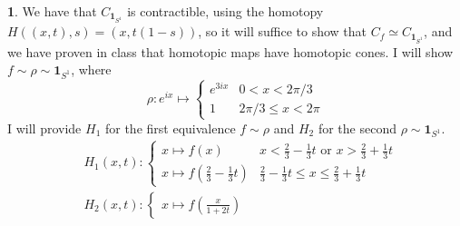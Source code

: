 \documentclass[10.5pt]{article}
\theoremstyle{definition}
\newtheorem{pb}{}
\newcommand{\tor}{\text{ or }}
\newcommand{\ism}{\simeq}
\begin{document}
\begin{pb}
        We have that \(C_{\mathbf{1}_{S^1}}\) is contractible, using the homotopy \(H((x,t),s) = (x,t(1-s))\), so it will suffice to show that \(C_{f} \ism C_{\mathbf{1}_{S^1}}\), and we 
        have proven in class that homotopic maps have homotopic cones. I will show \(f \sim \rho \sim \mathbf{1}_{S^1}\), where \[\rho: e^{ix} \mapsto 
        \begin{cases} 
        e^{3ix} & 0 < x < 2\pi/3 \\ 
        1 & 2\pi/3 \leq x < 2\pi
        \end{cases}\]
        I will provide \(H_1\) for the first equivalence \(f \sim \rho\) and \(H_2\) for the second \(\rho \sim \mathbf{1}_{S^1}\).
        \begin{align*}
            &H_1(x,t):
            \begin{cases}
                x \mapsto f(x) & x < \frac{2}{3} - \frac{1}{3}t \tor x > \frac{2}{3} + \frac{1}{3}t \\ 
                x \mapsto f(\frac{2}{3} - \frac{1}{3}t) & \frac{2}{3} - \frac{1}{3}t \leq x \leq \frac{2}{3} + \frac{1}{3}t
            \end{cases} \\
            &H_2(x,t):
            \begin{cases}
                x \mapsto f(\frac{x}{1 + 2t})
            \end{cases}
        \end{align*}

    \end{pb}
\end{document}
